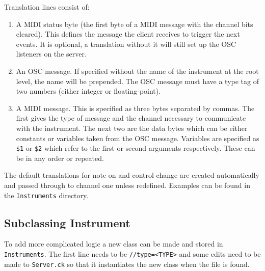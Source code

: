 \documentclass[11pt]{article}
\begin{document}
{\begin{table} [h]
\begin{tabularx} {\textwidth} {| l | >{\ttfamily}X | X | c |}
\end{tabularx}
\end{table}

Translation lines consist of: 
\begin{enumerate} [\bf 1.]
	\item A MIDI status byte (the first byte of a MIDI message with the channel bits cleared). This defines the message the client receives to trigger the next events.
	It is optional, a translation without it will still set up the OSC listeners on the server.
	\item An OSC message. If specified without the name of the instrument at the root level, the name will be prepended. The OSC message must have a type tag
	of two numbers (either integer or floating-point).
	\item A MIDI message. This is specified  as three bytes separated by commas. The first gives the type of message and the channel necessary to communicate
	with the instrument. The next two are the data bytes which can be either constants or variables taken from the OSC message. Variables are specified as
	\texttt{\$1} or \texttt{\$2} which refer to the first or second arguments respectively. These can be in any order or repeated.
\end{enumerate}
The default translations for note on and control change are created automatically and passed through to channel one unless redefined.
Examples can be found in the \texttt{Instruments} directory.

\subsection{Subclassing Instrument}
To add more complicated logic a new class can be made and stored in \texttt{Instruments}. The first line needs to be \texttt{//type=<TYPE>} and some edits need to
be made to \texttt{Server.ck} so that it instantiates the new class when the file is found.

}
\end{document}

